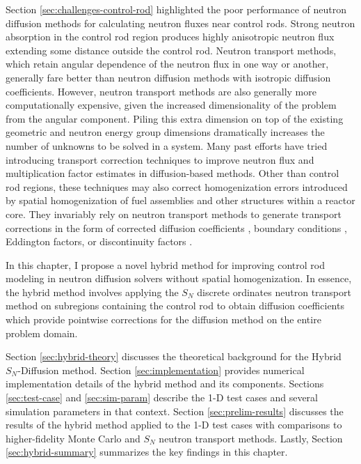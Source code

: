 Section \ref{sec:challenges-control-rod} highlighted the poor performance of neutron diffusion
methods for calculating neutron fluxes near control rods. Strong neutron absorption in the control
rod region produces highly anisotropic neutron flux extending some distance outside the control
rod. Neutron transport methods, which retain angular dependence of the neutron flux in one way or
another, generally fare better than neutron diffusion methods with isotropic diffusion
coefficients. However, neutron transport methods are also generally more computationally expensive,
given the increased dimensionality of the problem from the angular component. Piling this extra
dimension on top of the existing geometric and neutron energy group dimensions dramatically
increases the number of unknowns to be solved in a system. Many past efforts have tried introducing
transport correction techniques to improve neutron flux and multiplication factor estimates in
diffusion-based methods. Other than control rod regions, these techniques may also correct
homogenization errors introduced by spatial homogenization of fuel assemblies and other
structures within a reactor core. They invariably rely on neutron transport methods to generate
transport corrections in the form of corrected diffusion coefficients
\cite{bretscher_computing_1997, scherer_determination_1976, ronen_accurate_2004,
pounders_diffusion_2009, kavenoky_sph_1978}, boundary conditions \cite{davison_influence_1951,
pellaud_extrapolation_1968, fen_modelling_1992}, Eddington factors, or discontinuity factors
\cite{koebke_new_1980}.

In this chapter, I propose a novel hybrid method for improving control rod modeling in neutron
diffusion solvers without spatial homogenization. In essence, the hybrid method involves applying
the $S_N$ discrete ordinates neutron transport method on subregions containing the control rod to
obtain diffusion coefficients which provide pointwise corrections for the diffusion method on the
entire problem domain.

Section \ref{sec:hybrid-theory} discusses the theoretical background for the Hybrid $S_N$-Diffusion
method. Section \ref{sec:implementation} provides numerical implementation details of
the hybrid method and its components. Sections \ref{sec:test-case} and \ref{sec:sim-param} describe
the 1-D test cases and several simulation parameters in that context. Section
\ref{sec:prelim-results} discusses the results of the hybrid method applied to the 1-D test cases
with comparisons to higher-fidelity Monte Carlo and $S_N$ neutron transport methods. Lastly,
Section \ref{sec:hybrid-summary} summarizes the key findings in this chapter.

